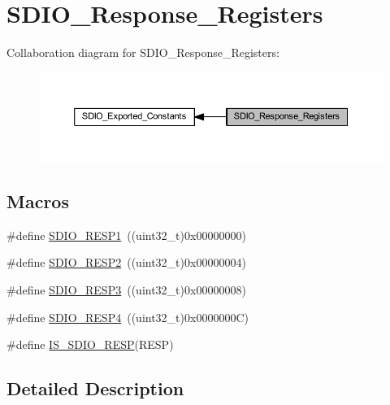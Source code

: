 \hypertarget{group___s_d_i_o___response___registers}{}\section{S\+D\+I\+O\+\_\+\+Response\+\_\+\+Registers}
\label{group___s_d_i_o___response___registers}
Collaboration diagram for S\+D\+I\+O\+\_\+\+Response\+\_\+\+Registers\+:
\nopagebreak
\begin{figure}[H]
\begin{center}
\leavevmode
\includegraphics[width=350pt]{group___s_d_i_o___response___registers}
\end{center}
\end{figure}
\subsection*{Macros}
\begin{DoxyCompactItemize}
\item 
\#define \hyperlink{group___s_d_i_o___response___registers_ga9d78943952cf0e36736313d949520a2d}{S\+D\+I\+O\+\_\+\+R\+E\+S\+P1}~((uint32\+\_\+t)0x00000000)
\item 
\#define \hyperlink{group___s_d_i_o___response___registers_gabd551272af4161844b5358fd3c3c379c}{S\+D\+I\+O\+\_\+\+R\+E\+S\+P2}~((uint32\+\_\+t)0x00000004)
\item 
\#define \hyperlink{group___s_d_i_o___response___registers_gae9887669a72395d54d600829a959d2f4}{S\+D\+I\+O\+\_\+\+R\+E\+S\+P3}~((uint32\+\_\+t)0x00000008)
\item 
\#define \hyperlink{group___s_d_i_o___response___registers_ga57c3f6414198e5497736e398c02a1d9e}{S\+D\+I\+O\+\_\+\+R\+E\+S\+P4}~((uint32\+\_\+t)0x0000000\+C)
\item 
\#define \hyperlink{group___s_d_i_o___response___registers_gaea6a7f75a5e677d50ba5c9ae2d3a7839}{I\+S\+\_\+\+S\+D\+I\+O\+\_\+\+R\+E\+SP}(R\+E\+SP)
\end{DoxyCompactItemize}


\subsection{Detailed Description}


